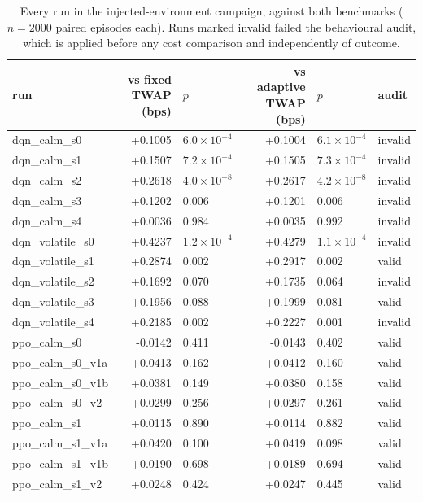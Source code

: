 \begin{table}[htbp]\centering
\caption{Every run in the injected-environment campaign, against both benchmarks
($n=2000$ paired episodes each). Runs marked invalid failed the behavioural audit,
which is applied before any cost comparison and independently of outcome.}
\label{tab:sigext-per-run}
\scriptsize
\begin{tabular}{lrlrll}
\toprule
run & vs fixed TWAP (bps) & $p$ & vs adaptive TWAP (bps) & $p$ & audit \\
\midrule
dqn\_calm\_s0 & +0.1005 & $6.0\times 10^{-4}$ & +0.1004 & $6.1\times 10^{-4}$ & invalid \\
dqn\_calm\_s1 & +0.1507 & $7.2\times 10^{-4}$ & +0.1505 & $7.3\times 10^{-4}$ & invalid \\
dqn\_calm\_s2 & +0.2618 & $4.0\times 10^{-8}$ & +0.2617 & $4.2\times 10^{-8}$ & invalid \\
dqn\_calm\_s3 & +0.1202 & 0.006 & +0.1201 & 0.006 & invalid \\
dqn\_calm\_s4 & +0.0036 & 0.984 & +0.0035 & 0.992 & invalid \\
dqn\_volatile\_s0 & +0.4237 & $1.2\times 10^{-4}$ & +0.4279 & $1.1\times 10^{-4}$ & invalid \\
dqn\_volatile\_s1 & +0.2874 & 0.002 & +0.2917 & 0.002 & valid \\
dqn\_volatile\_s2 & +0.1692 & 0.070 & +0.1735 & 0.064 & invalid \\
dqn\_volatile\_s3 & +0.1956 & 0.088 & +0.1999 & 0.081 & valid \\
dqn\_volatile\_s4 & +0.2185 & 0.002 & +0.2227 & 0.001 & invalid \\
ppo\_calm\_s0 & -0.0142 & 0.411 & -0.0143 & 0.402 & valid \\
ppo\_calm\_s0\_v1a & +0.0413 & 0.162 & +0.0412 & 0.160 & valid \\
ppo\_calm\_s0\_v1b & +0.0381 & 0.149 & +0.0380 & 0.158 & valid \\
ppo\_calm\_s0\_v2 & +0.0299 & 0.256 & +0.0297 & 0.261 & valid \\
ppo\_calm\_s1 & +0.0115 & 0.890 & +0.0114 & 0.882 & valid \\
ppo\_calm\_s1\_v1a & +0.0420 & 0.100 & +0.0419 & 0.098 & valid \\
ppo\_calm\_s1\_v1b & +0.0190 & 0.698 & +0.0189 & 0.694 & valid \\
ppo\_calm\_s1\_v2 & +0.0248 & 0.424 & +0.0247 & 0.445 & valid \\

\end{tabular}
\end{table}
